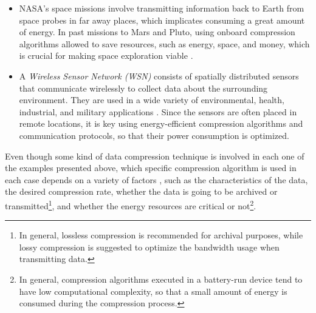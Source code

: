 \begin{itemize}
\item NASA's space missions involve transmitting information back to Earth from space probes in far away places, which implicates consuming a great amount of energy. In past missions to Mars and Pluto, using onboard compression algorithms allowed to save resources, such as energy, space, and money, which is crucial for making space exploration viable \cite{HPMars, Pluto}.

\item A \textit{Wireless Sensor Network (WSN)} consists of spatially distributed sensors that communicate wirelessly to collect data about the surrounding environment. They are used in a wide variety of environmental, health, industrial, and military applications \cite{WSNWiley, WSNList}. Since the sensors are often placed in remote locations, it is key using energy-efficient compression algorithms and communication protocols, so that their power consumption is optimized.
\end{itemize}


\newcommand{\footExampleOne}{\footnote{In general, lossless compression is recommended for archival purposes, while lossy compression is suggested to optimize the bandwidth usage when transmitting data.}}
\newcommand{\footExampleTwo}{\footnote{In general, compression algorithms executed in a battery-run device tend to have low computational complexity, so that a small amount of energy is consumed during the compression process.}}
\newcommand{\footSampling}{\footnote{In the context of WSNs, we consider that each sensor, which records data corresponding to a single signal, represents a different channel.}}


Even though some kind of data compression technique is involved in each one of the examples presented above, which specific compression algorithm is used in each case depends on a variety of factors \cite{DCTSurvey}, such as the characteristics of the data, the desired compression rate, whether the data is going to be archived or transmitted\footExampleOne, and whether the energy resources are critical or not\footExampleTwo.


